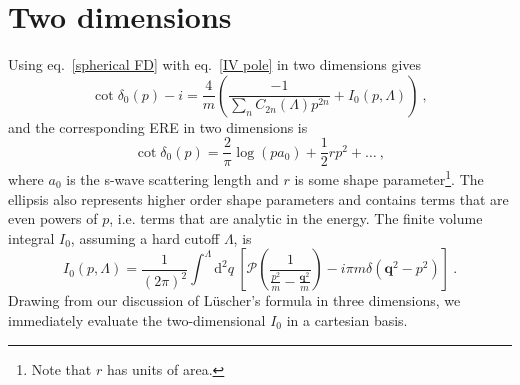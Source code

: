 \section{Two dimensions}

Using eq.~\eqref{spherical FD} with eq.~\eqref{IV pole} in two dimensions gives
\begin{equation}\label{eq:Q1}
\cot \delta_{0}(p)-i=\frac{4}{m} \left(\frac{-1}{\sum_nC_{2n}(\Lambda)p^{2n}}+I_{0}(p, \Lambda)\right)\ ,
\end{equation}
and the corresponding ERE in two dimensions is
\begin{equation}\label{eq:Q2}
\cot\delta_0(p)=\frac{2}{\pi}\log(p a_0)+\frac{1}{2} r p^2 + \ldots\ ,
\end{equation}
where $a_0$ is the s-wave scattering length and $r$ is some shape parameter\footnote{Note that $r$ has units of area.}.  The ellipsis also represents higher order shape parameters and contains terms that are even powers of $p$, i.e.  terms that are analytic in the energy.   The finite volume integral $I_0$, assuming a hard cutoff $\Lambda$, is
\begin{equation}\label{eq:I0 2d}
I_0(p,\Lambda)=\frac{1}{(2 \pi)^{2}} \int^{\Lambda} \mathrm{d}^2q\ \left[\mathcal{P}\left(\frac{1}{\frac{p^2}{m}-\frac{\bm{q}^{2}}{m}}\right)-i \pi m\delta(\bm q^2-p^2)\right]\ .
\end{equation}
Drawing from our discussion of L\"uscher's formula in three dimensions, we immediately evaluate the two-dimensional $I_0$ in a cartesian basis.  
